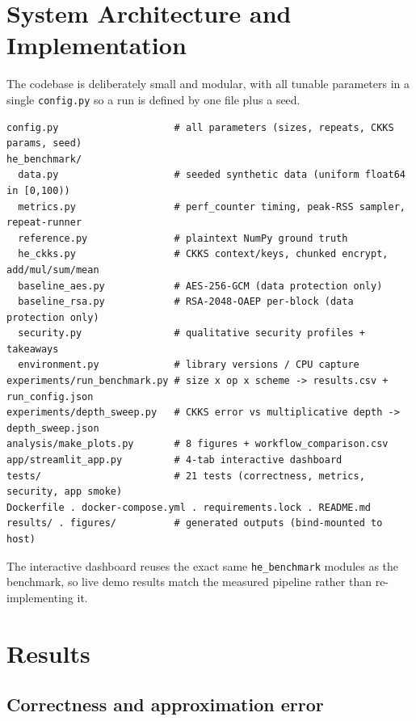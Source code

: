 \documentclass[11pt,a4paper]{article}
\begin{document}
\section{System Architecture and Implementation}

The codebase is deliberately small and modular, with all tunable parameters in a
single \texttt{config.py} so a run is defined by one file plus a seed.

\begin{lstlisting}[caption={Repository layout (core modules).},captionpos=b]
config.py                    # all parameters (sizes, repeats, CKKS params, seed)
he_benchmark/
  data.py                    # seeded synthetic data (uniform float64 in [0,100))
  metrics.py                 # perf_counter timing, peak-RSS sampler, repeat-runner
  reference.py               # plaintext NumPy ground truth
  he_ckks.py                 # CKKS context/keys, chunked encrypt, add/mul/sum/mean
  baseline_aes.py            # AES-256-GCM (data protection only)
  baseline_rsa.py            # RSA-2048-OAEP per-block (data protection only)
  security.py                # qualitative security profiles + takeaways
  environment.py             # library versions / CPU capture
experiments/run_benchmark.py # size x op x scheme -> results.csv + run_config.json
experiments/depth_sweep.py   # CKKS error vs multiplicative depth -> depth_sweep.json
analysis/make_plots.py       # 8 figures + workflow_comparison.csv
app/streamlit_app.py         # 4-tab interactive dashboard
tests/                       # 21 tests (correctness, metrics, security, app smoke)
Dockerfile . docker-compose.yml . requirements.lock . README.md
results/ . figures/          # generated outputs (bind-mounted to host)
\end{lstlisting}

The interactive dashboard reuses the exact same \texttt{he\_benchmark} modules as
the benchmark, so live demo results match the measured pipeline rather than
re-implementing it.

\section{Results}

\subsection{Correctness and approximation error}
\end{document}
